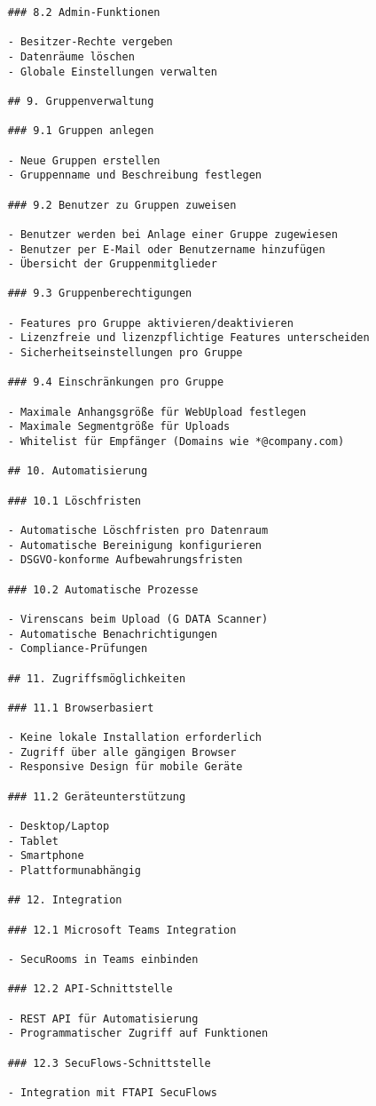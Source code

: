 \begin{verbatim}
    ### 8.2 Admin-Funktionen
    
    - Besitzer-Rechte vergeben
    - Datenräume löschen
    - Globale Einstellungen verwalten
    
    ## 9. Gruppenverwaltung
    
    ### 9.1 Gruppen anlegen
    
    - Neue Gruppen erstellen
    - Gruppenname und Beschreibung festlegen
    
    ### 9.2 Benutzer zu Gruppen zuweisen
    
    - Benutzer werden bei Anlage einer Gruppe zugewiesen
    - Benutzer per E-Mail oder Benutzername hinzufügen
    - Übersicht der Gruppenmitglieder
    
    ### 9.3 Gruppenberechtigungen
    
    - Features pro Gruppe aktivieren/deaktivieren
    - Lizenzfreie und lizenzpflichtige Features unterscheiden
    - Sicherheitseinstellungen pro Gruppe
    
    ### 9.4 Einschränkungen pro Gruppe
    
    - Maximale Anhangsgröße für WebUpload festlegen
    - Maximale Segmentgröße für Uploads
    - Whitelist für Empfänger (Domains wie *@company.com)
    
    ## 10. Automatisierung
    
    ### 10.1 Löschfristen
    
    - Automatische Löschfristen pro Datenraum
    - Automatische Bereinigung konfigurieren
    - DSGVO-konforme Aufbewahrungsfristen
    
    ### 10.2 Automatische Prozesse
    
    - Virenscans beim Upload (G DATA Scanner)
    - Automatische Benachrichtigungen
    - Compliance-Prüfungen
    
    ## 11. Zugriffsmöglichkeiten
    
    ### 11.1 Browserbasiert
    
    - Keine lokale Installation erforderlich
    - Zugriff über alle gängigen Browser
    - Responsive Design für mobile Geräte
    
    ### 11.2 Geräteunterstützung
    
    - Desktop/Laptop
    - Tablet
    - Smartphone
    - Plattformunabhängig
    
    ## 12. Integration
    
    ### 12.1 Microsoft Teams Integration
    
    - SecuRooms in Teams einbinden
    
    ### 12.2 API-Schnittstelle
    
    - REST API für Automatisierung
    - Programmatischer Zugriff auf Funktionen
    
    ### 12.3 SecuFlows-Schnittstelle
    
    - Integration mit FTAPI SecuFlows
\end{verbatim}

